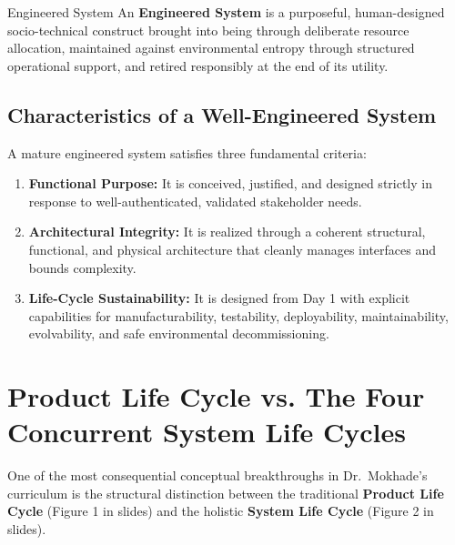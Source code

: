\begin{definitionbox}{Engineered System}
An \textbf{Engineered System} is a purposeful, human-designed socio-technical construct brought into being through deliberate resource allocation, maintained against environmental entropy through structured operational support, and retired responsibly at the end of its utility.
\end{definitionbox}

\subsection{Characteristics of a Well-Engineered System}
A mature engineered system satisfies three fundamental criteria:
\begin{enumerate}[leftmargin=2em]
    \item \textbf{Functional Purpose:} It is conceived, justified, and designed strictly in response to well-authenticated, validated stakeholder needs.
    \item \textbf{Architectural Integrity:} It is realized through a coherent structural, functional, and physical architecture that cleanly manages interfaces and bounds complexity.
    \item \textbf{Life-Cycle Sustainability:} It is designed from Day 1 with explicit capabilities for manufacturability, testability, deployability, maintainability, evolvability, and safe environmental decommissioning.
\end{enumerate}

\section{Product Life Cycle vs. The Four Concurrent System Life Cycles}
\label{sec:product_vs_system_lc}

One of the most consequential conceptual breakthroughs in Dr.~Mokhade's curriculum is the structural distinction between the traditional \textbf{Product Life Cycle} (Figure 1 in slides) and the holistic \textbf{System Life Cycle} (Figure 2 in slides).

